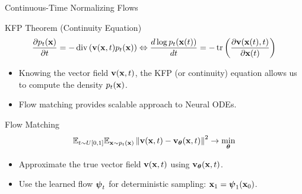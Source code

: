 \documentclass{beamer}
\begin{document}
\begin{frame}{Continuous-Time Normalizing Flows}
	\begin{block}{KFP Theorem (Continuity Equation)}
		\vspace{-0.5cm}
		\[
			\frac{\partial p_t(\mathbf{x})}{\partial t} = - \operatorname{div}\left(\mathbf{v}(\mathbf{x}, t) p_t(\mathbf{x})\right) \Leftrightarrow \frac{d \log p_t(\mathbf{x}(t))}{d t} = - \operatorname{tr} \left( \frac{\partial \mathbf{v}(\mathbf{x}(t), t)}{\partial \mathbf{x}(t)} \right)
		\]
		\vspace{-0.3cm}
	\end{block}
	\begin{itemize}
		\item Knowing the vector field $\mathbf{v} (\mathbf{x}, t)$, the KFP (or continuity) equation allows us to compute the density $p_t(\mathbf{x})$.
		\item Flow matching provides scalable approach to Neural ODEs.
	\end{itemize}
    \eqpause
	\begin{block}{Flow Matching}
		\vspace{-0.3cm}
		\[
			\mathbb{E}_{t \sim U[0, 1]} \mathbb{E}_{\mathbf{x} \sim p_t(\mathbf{x})}\left\| \mathbf{v}(\mathbf{x}, t) - \mathbf{v}_{\boldsymbol{\theta}}(\mathbf{x}, t) \right\|^2 \rightarrow \min_{\boldsymbol{\theta}}
		\]
		\vspace{-0.3cm}
	\end{block}
    \eqpause
	\begin{itemize}
		\item Approximate the true vector field $\mathbf{v} (\mathbf{x}, t)$ using $\mathbf{v}_{\boldsymbol{\theta}}(\mathbf{x}, t)$.
		\item Use the learned flow $\boldsymbol{\psi}_t$ for deterministic sampling: $\mathbf{x}_1 = \boldsymbol{\psi}_1(\mathbf{x}_0)$.
	\end{itemize}
\end{frame}
\end{document}
